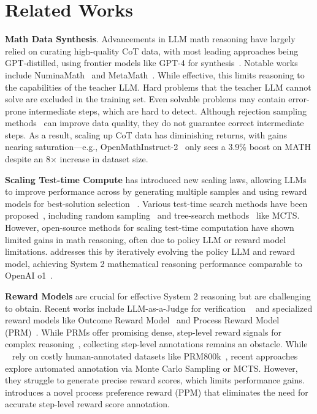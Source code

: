 \section{Related Works}

\noindent\textbf{Math Data Synthesis}.  Advancements in LLM math reasoning have largely relied on curating high-quality  CoT data, with most leading approaches being GPT-distilled, using frontier models like GPT-4 for synthesis~\citep{wang2024mathcoder,tora,luo2023wizardmath}. Notable works include NuminaMath~\citep{numina_math_datasets} and
MetaMath~\citep{yu2023metamath}. While effective, this limits reasoning to the capabilities of the teacher LLM.  
Hard problems that the teacher LLM cannot solve are excluded in the training set. 
   Even solvable problems may contain error-prone intermediate steps, which are hard to detect. Although rejection sampling methods~\citep{rejectionsampling,brown2024large} can improve data quality,
 they do not guarantee correct intermediate steps. As a result, scaling up CoT data has diminishing returns, with gains nearing saturation—e.g., OpenMathInstruct-2~\citep{openmath2} only sees a 3.9\% boost on MATH despite an 8× increase in dataset size.
   
   \noindent\textbf{Scaling Test-time Compute} has introduced new scaling laws,  allowing LLMs to improve performance across by generating multiple samples and using reward models for best-solution selection ~\citep{snell2024scaling,wu2024empirical,brown2024large}. Various test-time search methods have been proposed~\citep{ kang2024mindstar,wang2024qimprovingmultistepreasoning}, including  random sampling~\citep{selfconsistency} and tree-search methods~\citep{tot,rap,zhang2024accessing,rstar} like MCTS. However, open-source methods for scaling test-time computation have shown limited gains in math reasoning, often due to policy LLM or reward model limitations.   {\sysname} addresses this by iteratively evolving the policy LLM and reward model, achieving System 2 mathematical reasoning performance comparable to OpenAI o1~\citep{o1}.
   
   
   
   
   
   \noindent\textbf{Reward Models} are crucial for effective System 2 reasoning but are challenging to obtain. Recent works include LLM-as-a-Judge for verification ~\citep{llmjudge,rstar}  and specialized reward models like Outcome Reward Model~\citep{qwen2.5,yu2023outcome} and Process Reward Model (PRM)~\citep{lightman2024lets}. While PRMs offer promising dense, step-level reward signals for 
complex reasoning~\citep{luo2024improve,mathshepherd},  collecting step-level annotations remains an obstacle. While ~\cite{kang2024mindstar, wang2024qimprovingmultistepreasoning} rely on costly human-annotated datasets like PRM800k~\citep{lightman2024lets},
   recent approaches~\citep{mathshepherd,luo2024improve} explore automated annotation via Monte Carlo Sampling or MCTS. However,  they struggle to generate precise reward scores, which limits performance gains. {\sysname} introduces a novel process preference reward (PPM) that eliminates the need for accurate step-level reward score annotation. 
   
  
   
   
 














